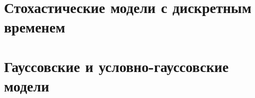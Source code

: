 \section{Стохастические модели с дискретным временем}


\section{Гауссовские и условно-гауссовские модели}